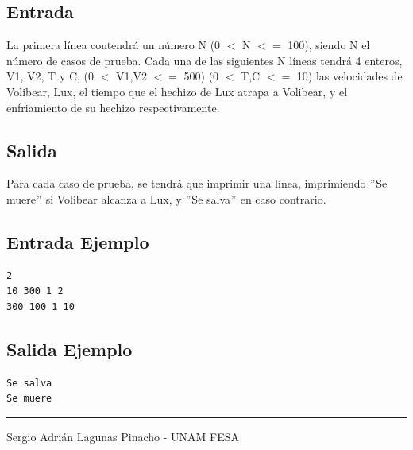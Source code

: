 \documentclass[letter,10pt]{article}
\newcommand{\lyxaddress}[1]{
\par {\raggedright #1
\vspace{1.4em}
\noindent\par}
}
\begin{document}
\subsection*{Entrada}

La primera línea contendrá un número N (0 $<$ N $<=$ 100), siendo N el número de casos de prueba.
Cada una de las siguientes N líneas tendrá 4 enteros, V1, V2, T y C, (0 $<$ V1,V2 $<=$ 500) (0 $<$ T,C $<=$ 10) las velocidades de Volibear, Lux, el tiempo que el hechizo de Lux atrapa a Volibear, y el enfriamiento de su hechizo respectivamente.

\subsection*{Salida}

Para cada caso de prueba, se tendrá que imprimir una línea, imprimiendo $"$Se muere$"$ si Volibear alcanza a Lux, y $"$Se salva$"$ en caso contrario.

\subsection*{Entrada Ejemplo}
\begin{verbatim}
2 
10 300 1 2
300 100 1 10
\end{verbatim}

\subsection*{Salida Ejemplo}

\begin{verbatim}
Se salva
Se muere
\end{verbatim}

\noindent \rule[0.5ex]{1\columnwidth}{1pt}


\lyxaddress{Sergio Adrián Lagunas Pinacho - UNAM FESA}
\end{document}

